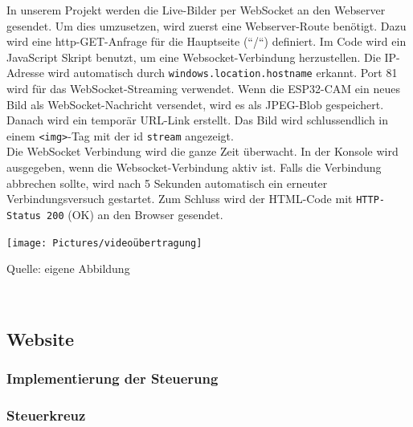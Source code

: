 \documentclass[ngerman,12pt,a4paper]{article}
\begin{document}
	In unserem Projekt werden die Live-Bilder per WebSocket an den Webserver gesendet. Um dies umzusetzen, wird zuerst eine Webserver-Route benötigt. Dazu wird eine http-GET-Anfrage für die Hauptseite (“/“) definiert. Im Code wird ein JavaScript Skript benutzt, um eine Websocket-Verbindung herzustellen. Die IP-Adresse wird automatisch durch \texttt{windows.location.hostname} erkannt. Port 81 wird für das WebSocket-Streaming verwendet. Wenn die ESP32-CAM ein neues Bild als WebSocket-Nachricht versendet, wird es als JPEG-Blob gespeichert. Danach wird ein temporär URL-Link erstellt. Das Bild wird schlussendlich in einem \texttt{<img>}-Tag mit der id \texttt{stream} angezeigt. \\[0.5cm]
	Die WebSocket Verbindung wird die ganze Zeit überwacht. In der Konsole wird ausgegeben, wenn die Websocket-Verbindung aktiv ist. Falls die Verbindung abbrechen sollte, wird nach 5 Sekunden automatisch ein erneuter Verbindungsversuch gestartet. Zum Schluss wird der HTML-Code mit \texttt{HTTP-Status 200} (OK) an den Browser gesendet. 
	\begin{center}
		\begin{minipage}[t]{0.95\textwidth}
			\texttt{[image: Pictures/videoübertragung]}
			\label{fig:Videoübertragung}
			\vspace{-10pt}
			\begin{center}
				\par\small Quelle: eigene Abbildung 
			\end{center}
		\end{minipage} \\[0.75cm]
	\end{center}
	
		\subsection{Website}

			\subsubsection{Implementierung der Steuerung}
			
				\subsubsection*{Steuerkreuz}
				
\end{document}
